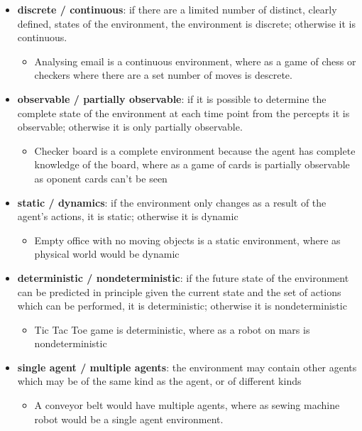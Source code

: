 \documentclass{article}
\begin{document}
\begin{itemize}
  \item \textbf{discrete / continuous}: if there are a limited number of distinct, clearly defined, states of the environment, the environment is discrete; otherwise it is continuous.
  \begin{itemize}
    \item Analysing email is a continuous environment, where as a game of chess or checkers where there are a set number of moves is descrete.
  \end{itemize}
  \item \textbf{observable / partially observable}: if it is possible to determine the complete state of the environment at each time point from the percepts it is observable; otherwise it is only partially observable.
  \begin{itemize}
    \item Checker board is a complete environment because the agent has complete knowledge of the board, where as a game of cards is partially observable as oponent cards can't be seen
  \end{itemize}
  \item \textbf{static / dynamics}: if the environment only changes as a result of the agent’s actions, it is static; otherwise it is dynamic
  \begin{itemize}
    \item Empty office with no moving objects is a static environment, where as physical world would be dynamic
  \end{itemize}
  \item \textbf{deterministic / nondeterministic}: if the future state of the environment can be predicted in principle given the current state and the set of actions which can be performed, it is deterministic; otherwise it is nondeterministic 
  \begin{itemize}
    \item Tic Tac Toe game is deterministic, where as a robot on mars is nondeterministic
  \end{itemize}
  \item \textbf{single agent / multiple agents}: the environment may contain other agents which may be of the same kind as the agent, or of different kinds
  \begin{itemize}
    \item A conveyor belt would have multiple agents, where as sewing machine robot would be a single agent environment.
  \end{itemize}
\end{itemize}
\end{document}
